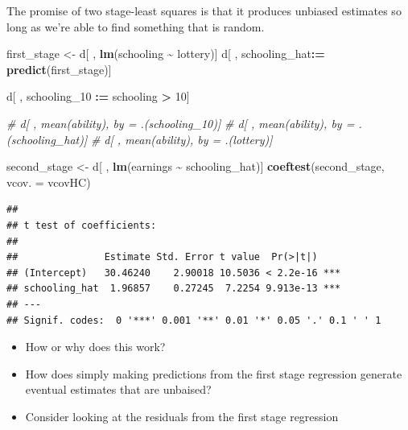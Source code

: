 \documentclass[
]{article}
\newenvironment{Shaded}{\begin{snugshade}}{\end{snugshade}}
\newcommand{\AttributeTok}[1]{\textcolor[rgb]{0.13,0.29,0.53}{#1}}
\newcommand{\CommentTok}[1]{\textcolor[rgb]{0.56,0.35,0.01}{\textit{#1}}}
\newcommand{\DecValTok}[1]{\textcolor[rgb]{0.00,0.00,0.81}{#1}}
\newcommand{\FunctionTok}[1]{\textcolor[rgb]{0.13,0.29,0.53}{\textbf{#1}}}
\newcommand{\NormalTok}[1]{#1}
\newcommand{\OtherTok}[1]{\textcolor[rgb]{0.56,0.35,0.01}{#1}}
\newcommand{\SpecialCharTok}[1]{\textcolor[rgb]{0.81,0.36,0.00}{\textbf{#1}}}
\providecommand{\tightlist}{%
  \setlength{\itemsep}{0pt}\setlength{\parskip}{0pt}}
\theoremstyle{definition}
\theoremstyle{definition}
\theoremstyle{definition}
\theoremstyle{definition}
\theoremstyle{remark}
\begin{document}
The promise of two stage-least squares is that it produces unbiased estimates so long as we're able to find something that is random.

\begin{Shaded}
\begin{Highlighting}[]
\NormalTok{first\_stage }\OtherTok{\textless{}{-}}\NormalTok{ d[ , }\FunctionTok{lm}\NormalTok{(schooling }\SpecialCharTok{\textasciitilde{}}\NormalTok{ lottery)] }
\NormalTok{d[ , schooling\_hat}\SpecialCharTok{:=} \FunctionTok{predict}\NormalTok{(first\_stage)] }

\NormalTok{d[ , schooling\_10 }\SpecialCharTok{:=}\NormalTok{ schooling }\SpecialCharTok{\textgreater{}} \DecValTok{10}\NormalTok{]}

\CommentTok{\# d[ , mean(ability), by = .(schooling\_10)]}
\CommentTok{\# d[ , mean(ability), by = .(schooling\_hat)]}
\CommentTok{\# d[ , mean(ability), by = .(lottery)]}

\NormalTok{second\_stage }\OtherTok{\textless{}{-}}\NormalTok{ d[ , }\FunctionTok{lm}\NormalTok{(earnings }\SpecialCharTok{\textasciitilde{}}\NormalTok{ schooling\_hat)]}
\FunctionTok{coeftest}\NormalTok{(second\_stage, }\AttributeTok{vcov. =}\NormalTok{ vcovHC)}
\end{Highlighting}
\end{Shaded}

\begin{verbatim}
## 
## t test of coefficients:
## 
##               Estimate Std. Error t value  Pr(>|t|)    
## (Intercept)   30.46240    2.90018 10.5036 < 2.2e-16 ***
## schooling_hat  1.96857    0.27245  7.2254 9.913e-13 ***
## ---
## Signif. codes:  0 '***' 0.001 '**' 0.01 '*' 0.05 '.' 0.1 ' ' 1
\end{verbatim}

\begin{itemize}
\tightlist
\item
  How or why does this work?
\item
  How does simply making predictions from the first stage regression generate eventual estimates that are unbaised?
\item
  Consider looking at the residuals from the first stage regression
\end{itemize}
\end{document}

